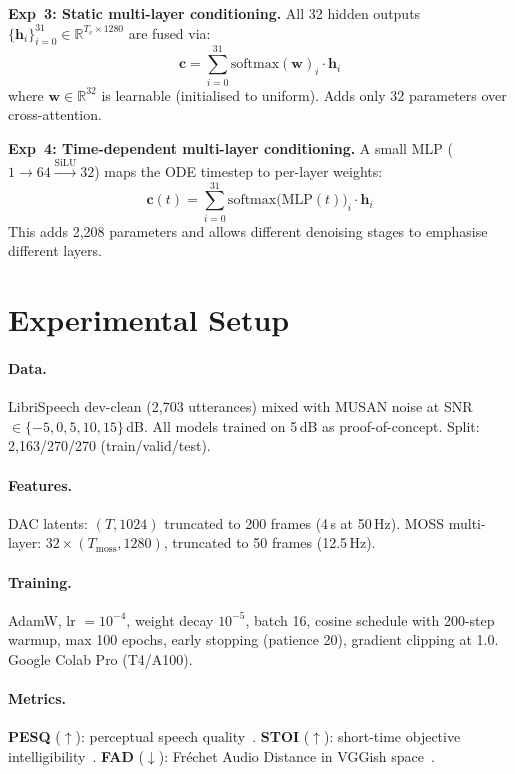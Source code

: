 \documentclass[10pt,twocolumn,letterpaper]{article}
\begin{document}
\textbf{Exp~3: Static multi-layer conditioning.}
All 32 hidden outputs $\{\mathbf{h}_i\}_{i=0}^{31} \in \mathbb{R}^{T_c \times 1280}$ are fused via:
\begin{equation}
  \mathbf{c} = \sum_{i=0}^{31} \text{softmax}(\mathbf{w})_i \cdot \mathbf{h}_i
  \label{eq:static}
\end{equation}
where $\mathbf{w} \in \mathbb{R}^{32}$ is learnable (initialised to uniform). Adds only 32 parameters over cross-attention.

\textbf{Exp~4: Time-dependent multi-layer conditioning.}
A small MLP ($1 \!\to\! 64 \!\xrightarrow{\text{SiLU}}\! 32$) maps the ODE timestep to per-layer weights:
\begin{equation}
  \mathbf{c}(t) = \sum_{i=0}^{31} \text{softmax}\big(\text{MLP}(t)\big)_i \cdot \mathbf{h}_i
  \label{eq:timedep}
\end{equation}
This adds 2,208 parameters and allows different denoising stages to emphasise different layers.

\section{Experimental Setup}
\label{sec:setup}

\paragraph{Data.}
LibriSpeech dev-clean (2,703 utterances) mixed with MUSAN noise at SNR $\in \{-5, 0, 5, 10, 15\}$\,dB. All models trained on 5\,dB as proof-of-concept. Split: 2,163/270/270 (train/valid/test).

\paragraph{Features.}
DAC latents: $(T, 1024)$ truncated to 200 frames (4\,s at 50\,Hz). MOSS multi-layer: $32 \times (T_{\text{moss}}, 1280)$, truncated to 50 frames (12.5\,Hz).

\paragraph{Training.}
AdamW, lr $= 10^{-4}$, weight decay $10^{-5}$, batch 16, cosine schedule with 200-step warmup, max 100 epochs, early stopping (patience 20), gradient clipping at 1.0. Google Colab Pro (T4/A100).

\paragraph{Metrics.}
\textbf{PESQ} ($\uparrow$): perceptual speech quality~\cite{rix2001pesq}. \textbf{STOI} ($\uparrow$): short-time objective intelligibility~\cite{taal2010stoi}. \textbf{FAD} ($\downarrow$): Fr\'{e}chet Audio Distance in VGGish space~\cite{kilgour2019fad}.
\end{document}

